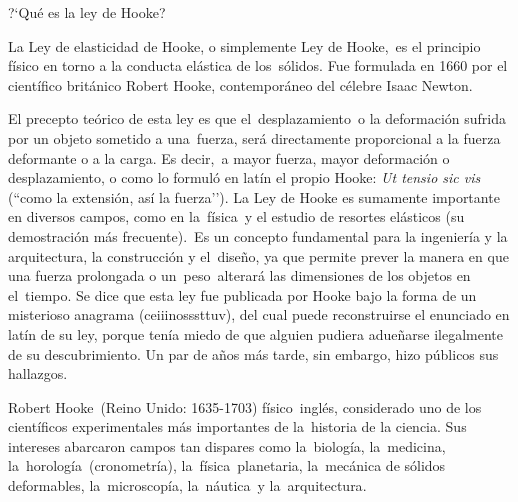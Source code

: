\begin{myblock}{?`Qué es la ley de Hooke?}


\vspace{2mm} La Ley de elasticidad de Hooke, o simplemente Ley de Hooke, es el principio físico en torno a la conducta elástica de los sólidos. Fue formulada en 1660 por el científico británico Robert Hooke, contemporáneo del célebre Isaac Newton.

\vspace{2mm} El precepto teórico de esta ley es que el desplazamiento o la deformación sufrida por un objeto sometido a una fuerza, será directamente proporcional a la fuerza deformante o a la carga. Es decir, a mayor fuerza, mayor deformación o desplazamiento, o como lo formuló en latín el propio Hooke: \emph{\textsf{Ut tensio sic vis}}  (``como la extensión, así la fuerza’’).
\vspace{2mm} La Ley de Hooke es sumamente importante en diversos campos, como en la física y el estudio de resortes elásticos (su demostración más frecuente). Es un concepto fundamental para la ingeniería y la arquitectura, la construcción y el diseño, ya que permite prever la manera en que una fuerza prolongada o un peso alterará las dimensiones de los objetos en el tiempo.
\vspace{2mm} Se dice que esta ley fue publicada por Hooke bajo la forma de un misterioso anagrama (ceiiinosssttuv), del cual puede reconstruirse el enunciado en latín de su ley, porque tenía miedo de que alguien pudiera adueñarse ilegalmente de su descubrimiento. Un par de años más tarde, sin embargo, hizo públicos sus hallazgos.


\vspace{2mm} \textcolor{gris}{\small{Robert Hooke (Reino Unido: 1635-1703) físico inglés, considerado uno de los científicos experimentales más importantes de la historia de la ciencia. Sus intereses abarcaron campos tan dispares como la biología, la medicina, la horología (cronometría), la física planetaria, la mecánica de sólidos deformables, la microscopía, la náutica y la arquitectura}\normalsize{.}}	
\end{myblock}







